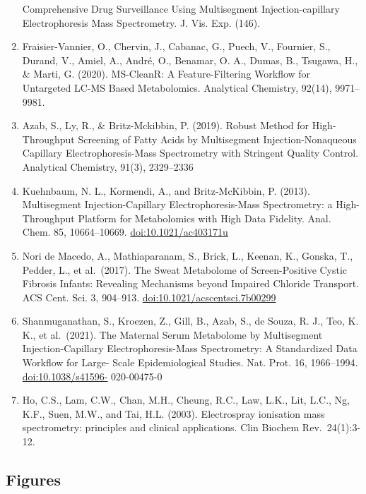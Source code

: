 \documentclass[journal=jacsat,manuscript=article]{achemso}
\begin{document}
\begin{enumerate}
  Comprehensive Drug Surveillance Using Multisegment Injection-capillary
  Electrophoresis Mass Spectrometry. J. Vis. Exp. (146).
\item
  Fraisier-Vannier, O., Chervin, J., Cabanac, G., Puech, V., Fournier,
  S., Durand, V., Amiel, A., André, O., Benamar, O. A., Dumas, B.,
  Tsugawa, H., \& Marti, G. (2020). MS-CleanR: A Feature-Filtering
  Workflow for Untargeted LC-MS Based Metabolomics. Analytical
  Chemistry, 92(14), 9971--9981.
\item
  Azab, S., Ly, R., \& Britz-Mckibbin, P. (2019). Robust Method for
  High-Throughput Screening of Fatty Acids by Multisegment
  Injection-Nonaqueous Capillary Electrophoresis-Mass Spectrometry with
  Stringent Quality Control. Analytical Chemistry, 91(3), 2329--2336
\item
  Kuehnbaum, N. L., Kormendi, A., and Britz-McKibbin, P. (2013).
  Multisegment Injection-Capillary Electrophoresis-Mass Spectrometry: a
  High-Throughput Platform for Metabolomics with High Data Fidelity.
  Anal. Chem. 85, 10664--10669. \url{doi:10.1021/ac403171u}
\item
  Nori de Macedo, A., Mathiaparanam, S., Brick, L., Keenan, K., Gonska,
  T., Pedder, L., et al.~(2017). The Sweat Metabolome of Screen-Positive
  Cystic Fibrosis Infants: Revealing Mechanisms beyond Impaired Chloride
  Transport. ACS Cent. Sci. 3, 904--913.
  \url{doi:10.1021/acscentsci.7b00299}
\item
  Shanmuganathan, S., Kroezen, Z., Gill, B., Azab, S., de Souza, R. J.,
  Teo, K. K., et al.~(2021). The Maternal Serum Metabolome by
  Multisegment Injection-Capillary Electrophoresis-Mass Spectrometry: A
  Standardized Data Workflow for Large- Scale Epidemiological Studies.
  Nat. Prot. 16, 1966--1994. \url{doi:10.1038/s41596-} 020-00475-0
\item
  Ho, C.S., Lam, C.W., Chan, M.H., Cheung, R.C., Law, L.K., Lit, L.C.,
  Ng, K.F., Suen, M.W., and Tai, H.L. (2003). Electrospray ionisation
  mass spectrometry: principles and clinical applications. Clin Biochem
  Rev.~24(1):3-12.
\end{enumerate}

\hypertarget{figures}{%
\subsection{Figures}\label{figures}}
\end{document}
